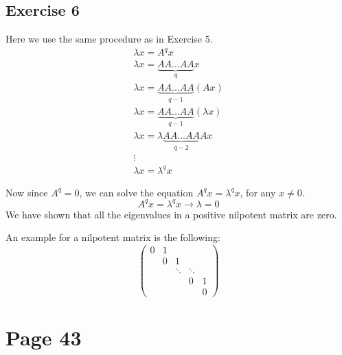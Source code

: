 \subsection{Exercise 6}
Here we use the same procedure as in Exercise 5.
\begin{gather*}
\lambda x = A^q x\\
\lambda x = \underbrace{AA...AA}_{q} x \\
\lambda x = \underbrace{AA...AA}_{q-1} (A x) \\
\lambda x = \underbrace{AA...AA}_{q-1} (\lambda x)\\
\lambda x = \lambda \underbrace{AA...AA}_{q-2} A x\\
\vdots \\
\lambda x = \lambda^{q} x 
\end{gather*}

Now since $A^q = 0$, we can solve the equation $A^q x = \lambda^q x$, for any $x \neq 0$.
\begin{equation*}
A^q x = \lambda^q x \rightarrow \lambda = 0
\end{equation*}
We have shown that all the eigenvalues in a positive nilpotent matrix are zero.

An example for a nilpotent matrix is the following:
\begin{equation*}
\left( \begin{array}{ccccc}
0 & 1 & & & \\
& 0 & 1 & & \\
& & \ddots &\ddots & \\
&  & & 0 & 1 \\
& & & & 0 
\end{array}\right)
\end{equation*}

\section{Page 43}
